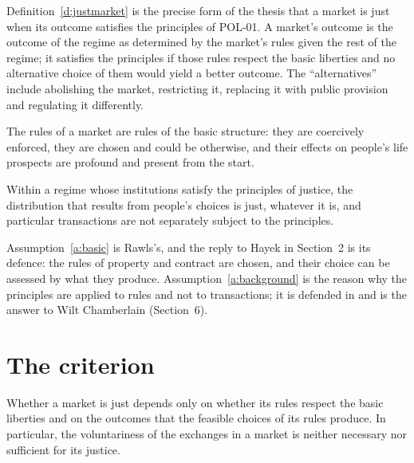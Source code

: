 \documentclass{situationist-preprint}
\begin{document}
Definition~\ref{d:justmarket} is the precise form of the thesis that a market is just when its outcome satisfies the principles of POL-01. A market's outcome is the outcome of the regime as determined by the market's rules given the rest of the regime; it satisfies the principles if those rules respect the basic liberties and no alternative choice of them would yield a better outcome. The \enquote{alternatives} include abolishing the market, restricting it, replacing it with public provision and regulating it differently.

\begin{assumption}\label{a:basic}
The rules of a market are rules of the basic structure: they are coercively enforced, they are chosen and could be otherwise, and their effects on people's life prospects are profound and present from the start.
\end{assumption}

\begin{assumption}\label{a:background}
Within a regime whose institutions satisfy the principles of justice, the distribution that results from people's choices is just, whatever it is, and particular transactions are not separately subject to the principles.
\end{assumption}

Assumption~\ref{a:basic} is Rawls's, and the reply to Hayek in Section~2 is its defence: the rules of property and contract are chosen, and their choice can be assessed by what they produce. Assumption~\ref{a:background} is the reason why the principles are applied to rules and not to transactions; it is defended in \citet{Rawls1977} and is the answer to Wilt Chamberlain (Section~6).

\section{The criterion}

\begin{theorem}\label{t:criterion}
Whether a market is just depends only on whether its rules respect the basic liberties and on the outcomes that the feasible choices of its rules produce. In particular, the voluntariness of the exchanges in a market is neither necessary nor sufficient for its justice.
\end{theorem}
\end{document}
